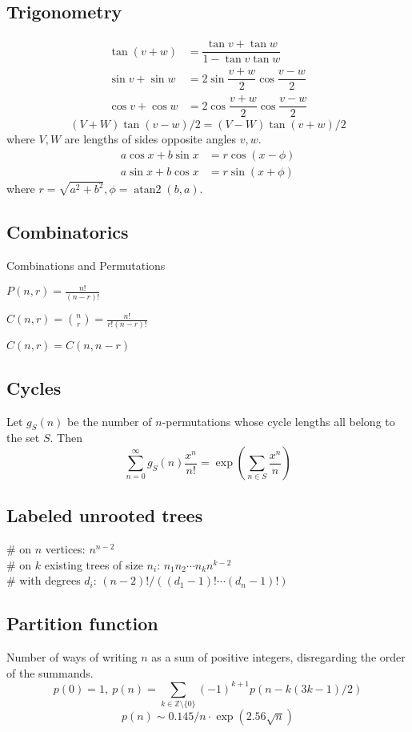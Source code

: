 \documentclass[
	a4paper,
	landscape,
	10pt,
]{article}
\begin{document}
\begin{multicols}{3}
	\subsection{Trigonometry} \vspace{-1cm}
        \begin{align*}
        \tan(v+w)&{}=\dfrac{\tan v+\tan w}{1-\tan v\tan w}\\
        \sin v+\sin w&{}=2\sin\dfrac{v+w}{2}\cos\dfrac{v-w}{2}\\
        \cos v+\cos w&{}=2\cos\dfrac{v+w}{2}\cos\dfrac{v-w}{2}
        \end{align*}
        \[ (V+W)\tan(v-w)/2{}=(V-W)\tan(v+w)/2 \]
        where $V, W$ are lengths of sides opposite angles $v, w$.
        \begin{align*}
        	a\cos x+b\sin x&=r\cos(x-\phi)\\
        	a\sin x+b\cos x&=r\sin(x+\phi)
        \end{align*}
        where $r=\sqrt{a^2+b^2}, \phi=\operatorname{atan2}(b,a)$.
        

    \subsection{Combinatorics}
        Combinations and Permutations
        
        $P(n,r) = \frac{n!}{(n-r)!}$
        
        $C(n,r) = \binom{n}{r} = \frac{n!}{r!(n-r)!}$
        
        $C(n,r) = C(n, n-r)$

	\subsection{Cycles}
		Let $g_S(n)$ be the number of $n$-permutations whose cycle lengths all belong to the set $S$. Then
		$$\sum_{n=0} ^\infty g_S(n) \frac{x^n}{n!} = \exp\left(\sum_{n\in S} \frac{x^n} {n} \right)$$
		
	\subsection{Labeled unrooted trees}
		\# on $n$ vertices: $n^{n-2}$ \\
		\# on $k$ existing trees of size $n_i$: $n_1n_2\cdots n_k n^{k-2}$ \\
		\# with degrees $d_i$: $(n-2)! / ((d_1-1)! \cdots (d_n-1)!)$

	\subsection{Partition function}
		Number of ways of writing $n$ as a sum of positive integers, disregarding the order of the summands.
		\[ p(0) = 1,\ p(n) = \sum_{k \in \mathbb Z \setminus \{0\}}{(-1)^{k+1} p(n - k(3k-1) / 2)} \]
		\[ p(n) \sim 0.145 / n \cdot \exp(2.56 \sqrt{n}) \]


\end{multicols}
\end{document}
